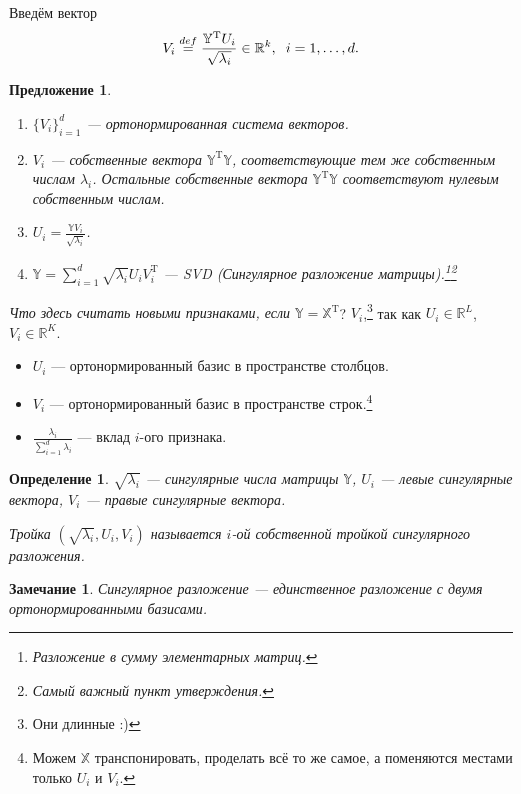 \documentclass[specialist, 12pt,
subf, %
href, colorlinks=true,
substylefile = spbu.rtx,
]{disser}
\newtheorem{proposition}{Предложение}
\newtheorem{definition}{Определение}
\newtheorem{remark}{Замечание}
\begin{document}
Введём вектор
\begin{gather*}
V_i \stackrel{def}{=} \frac{\mathbb{Y}^{\mathrm{T}}U_i}{\sqrt{\lambda_i}} \in \mathbb{R}^k, \hspace{0.2 cm} i = 1, \ldots, d.
\end{gather*}
\begin{proposition}
	\begin{enumerate}
		\item $\{V_i\}_{i = 1}^d$ --- ортонормированная система векторов.
		\item $V_i$ --- собственные вектора $ \mathbb{Y}^{\mathrm{T}}\mathbb{Y}$, соответствующие тем же собственным числам $\lambda_i$. Остальные собственные вектора $ \mathbb{Y}^{\mathrm{T}}\mathbb{Y}$ соответствуют нулевым собственным числам.
		\item $U_i = \displaystyle{\frac{\mathbb{Y}V_i}{\sqrt{\lambda_i}}}$.
		\item $\mathbb{Y} = \sum\limits_{i = 1}^d \sqrt{\lambda_i} U_i V_i^{\mathrm{T}}$ --- SVD (Сингулярное разложение матрицы).\footnote{Разложение в сумму элементарных матриц.}\footnote{Самый важный пункт утверждения.}
	\end{enumerate}
\end{proposition}
\textit{Что здесь считать новыми признаками, если $\mathbb{Y} = \mathbb{X}^{\mathrm{T}}$}? $V_i$,\footnote{Они длинные :)} так как $U_i \in \mathbb{R}^L$, $V_i \in \mathbb{R}^K$.
\begin{itemize}
	\item $U_i$ --- ортонормированный базис в пространстве столбцов.
	\item $V_i$ --- ортонормированный базис в пространстве строк.\footnote{Можем $\mathbb{X}$ транспонировать, проделать всё то же самое, а поменяются местами только $U_i$ и $V_i$.}
	\item $\displaystyle\frac{\lambda_i}{\sum_{i=1}^d \lambda_i}$ --- вклад $i$-ого признака.
\end{itemize}
 \begin{definition}
 		$\sqrt{\lambda_i}$ --- \textit{сингулярные числа} матрицы $\mathbb{Y}$, $U_i$ --- \textit{левые сингулярные вектора}, $V_i$ --- \textit{правые сингулярные вектора}.
 		
 	Тройка $(\sqrt{\lambda_i},U_i,V_i)$ называется $i$-ой собственной тройкой сингулярного разложения.
 \end{definition}

\begin{remark}
	Сингулярное разложение --- единственное разложение с двумя ортонормированными базисами.
\end{remark}
\end{document}
